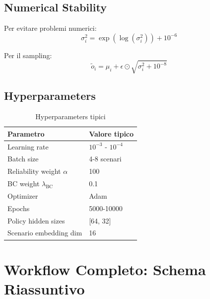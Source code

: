 \documentclass[11pt,a4paper]{article}
\begin{document}
\subsection{Numerical Stability}

Per evitare problemi numerici:
\begin{equation}
\sigma_i^2 = \exp(\log(\sigma_i^2)) + 10^{-6}
\end{equation}

Per il sampling:
\begin{equation}
\tilde{o}_i = \mu_i + \epsilon \odot \sqrt{\sigma_i^2 + 10^{-8}}
\end{equation}

\subsection{Hyperparameters}

\begin{table}[h]
\centering
\begin{tabular}{ll}
\toprule
\textbf{Parametro} & \textbf{Valore tipico} \\
\midrule
Learning rate & $10^{-3}$ - $10^{-4}$ \\
Batch size & 4-8 scenari \\
Reliability weight $\alpha$ & 100 \\
BC weight $\lambda_{\text{BC}}$ & 0.1 \\
Optimizer & Adam \\
Epochs & 5000-10000 \\
Policy hidden sizes & [64, 32] \\
Scenario embedding dim & 16 \\
\bottomrule
\end{tabular}
\caption{Hyperparameters tipici}
\end{table}

\section{Workflow Completo: Schema Riassuntivo}
\end{document}
